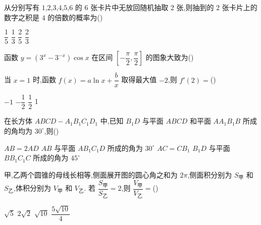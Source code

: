 \begin{problem}
从分别写有 \(1\),\(2\),\(3\),\(4\),\(5\),\(6\) 的 \(6\) 张卡片中无放回随机抽取 \(2\) 张,则抽到的 \(2\) 张卡片上的数字之积是 \(4\) 的倍数的概率为(\quad)

\choices
    {\(\dfrac{1}{5}\)}
    {\(\dfrac{1}{3}\)}
    {\(\dfrac{2}{5}\)}
    {\(\dfrac{2}{3}\)}
\end{problem}

\begin{problem}
函数 \(y=\left(3^x-3^{-x}\right)\cos x\) 在区间 \(\left[-\dfrac{\pi}{2},\dfrac{\pi}{2}\right]\) 的图象大致为(\quad)

\choices
    {}
    {}
    {}
    {}
\end{problem}

\begin{problem}
当 \(x=1\) 时,函数 \(f(x)=a\ln x+\dfrac{b}{x}\) 取得最大值 \(-2\),则 \(f'(2)=\)(\quad)

\choices
    {\(-1\)}
    {\(-\dfrac{1}{2}\)}
    {\(\dfrac{1}{2}\)}
    {1}
\end{problem}

\begin{problem}
在长方体 \(ABCD-A_1B_1C_1D_1\) 中,已知 \(B_1D\) 与平面 \(ABCD\) 和平面 \(AA_1B_1B\) 所成的角均为 \(30^\circ\),则(\quad)


\choices
    {\(AB=2AD\)}
    {\(AB\) 与平面 \(AB_1C_1D\) 所成的角为 \(30^\circ\)}
    {\(AC=CB_1\)}
    {\(B_1D\) 与平面 \(BB_1C_1C\) 所成的角为 \(45^\circ\)}
\end{problem}

\begin{problem}
甲,乙两个圆锥的母线长相等,侧面展开图的圆心角之和为 \(2\pi\),侧面积分别为 \(S_{\text{甲}}\) 和 \(S_{\text{乙}}\),体积分别为 \(V_{\text{甲}}\) 和 \(V_{\text{乙}}\). 若 \(\dfrac{S_{\text{甲}}}{S_{\text{乙}}}=2\),则 \(\dfrac{V_{\text{甲}}}{V_{\text{乙}}}=\)(\quad)

\choices
    {\(\sqrt{5}\)}
    {\(2\sqrt{2}\)}
    {\(\sqrt{10}\)}
    {\(\dfrac{5\sqrt{10}}{4}\)}
\end{problem}

